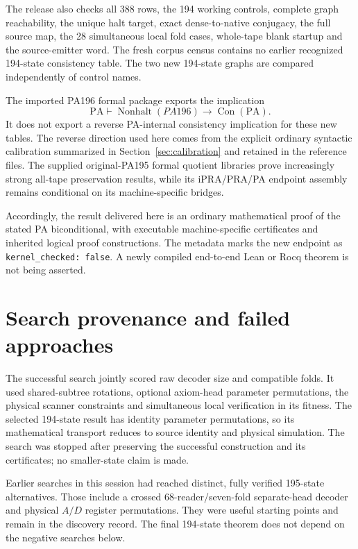 \documentclass[11pt,letterpaper]{article}
\newcommand{\PA}{\mathrm{PA}}
\newcommand{\Con}{\operatorname{Con}}
\newcommand{\file}[1]{\texttt{\nolinkurl{#1}}}
\begin{document}
The release also checks all 388 rows, the 194 working controls, complete
graph reachability, the unique halt target, exact dense-to-native
conjugacy, the full source map, the 28 simultaneous local fold cases,
whole-tape blank startup and the source-emitter word. The fresh corpus
census contains no earlier recognized 194-state consistency table.
The two new 194-state graphs are compared independently of control names.

The imported PA196 formal package exports the implication
\[
       \PA\vdash\operatorname{Nonhalt}(PA196)\to\Con(\PA).
\]
It does not export a reverse PA-internal consistency implication for
these new tables. The reverse direction used here comes from the explicit
ordinary syntactic calibration summarized in Section~\ref{sec:calibration}
and retained in the reference files. The supplied original-PA195 formal
quotient libraries prove increasingly strong all-tape preservation results,
while its iPRA/PRA/PA endpoint assembly remains conditional on its
machine-specific bridges.

Accordingly, the result delivered here is an ordinary mathematical proof
of the stated PA biconditional, with executable machine-specific
certificates and inherited logical proof constructions. The metadata
marks the new endpoint as \file{kernel_checked: false}. A newly compiled
end-to-end Lean or Rocq theorem is not being asserted.

\section{Search provenance and failed approaches}
\label{sec:search}



The successful search jointly scored raw decoder size and compatible
folds. It used shared-subtree rotations, optional axiom-head parameter
permutations, the physical scanner constraints and simultaneous local
verification in its fitness. The selected 194-state result has identity
parameter permutations, so its mathematical transport reduces to source
identity and physical simulation. The search was stopped after preserving
the successful construction and its certificates; no smaller-state claim
is made.

Earlier searches in this session had reached distinct, fully verified
195-state alternatives. Those include a crossed 68-reader/seven-fold
separate-head decoder and physical $A/D$ register permutations. They were
useful starting points and remain in the discovery record. The final
194-state theorem does not depend on the negative searches below.
\end{document}
